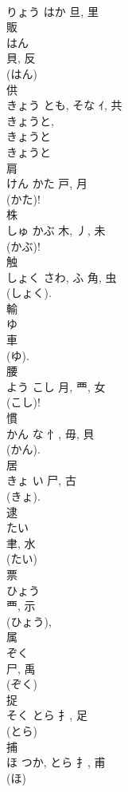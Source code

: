 \documentclass[8pt]{extreport}
\begin{document}
\begin{CJK}{UTF8}{min}
\\	りょう	はか	旦, 里	
\\	販	
\\	はん	
\\	貝, 反	
\\	(はん) 
\\	供	
\\	きょう	とも, そな	ｲ, 共	
\\	きょうと, 
\\	きょうと 
\\	きょうと 
\\	肩	
\\	けん	かた	戸, 月	
\\	(かた)!
\\	株	
\\	しゅ	かぶ	木, 丿, 未	
\\	(かぶ)! 
\\	触	
\\	しょく	さわ, ふ	角, 虫	
\\	(しょく). 
\\	輸	
\\	ゆ	
\\	車		
\\	(ゆ). 
\\	腰	
\\	よう	こし	月, 覀, 女	
\\	(こし)! 
\\	慣	
\\	かん	な	忄, 毋, 貝	
\\	(かん). 
\\	居	
\\	きょ	い	尸, 古	
\\	(きょ).	
\\	逮	
\\	たい	
\\	聿, 水		
\\	(たい) 
\\	票	
\\	ひょう	
\\	覀, 示	
\\	(ひょう), 
\\	属	
\\	ぞく	
\\	尸, 禹	
\\	(ぞく) 
\\	捉	
\\	そく	とら	扌, 足	
\\	(とら) 
\\	捕	
\\	ほ	つか, とら	扌, 甫	
\\	(ほ) 

\end{CJK}
\end{document}
